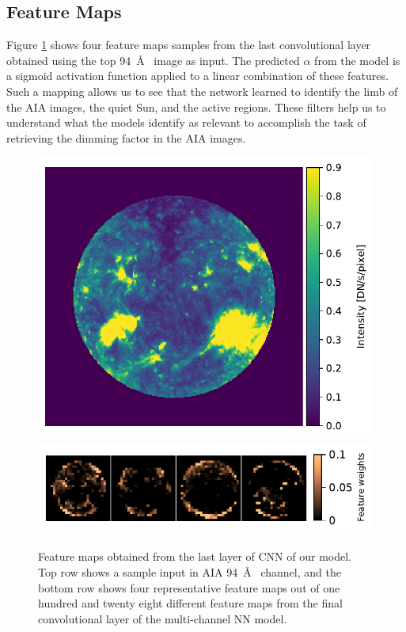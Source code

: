 \documentclass[twocolumn,usenames,dvipsnames]{aastex63}
\begin{document}
\subsection{Feature Maps}
    \label{sec:feature-maps}

Figure \ref{fig:autocalibrate_activation_viz} shows four feature maps samples from the last convolutional layer obtained using the top 94~\AA~ image as input. The predicted $\alpha$ from the model is a sigmoid activation function applied to a linear combination of these features. Such a mapping allows us to see that the network learned to identify the limb of the AIA images, the quiet Sun, and the active regions. These filters help us to understand what the models identify as relevant to accomplish the task of retrieving the dimming factor in the AIA images. 

\begin{figure} [h]
  \centering
  \includegraphics[width=0.8\linewidth]{reference.pdf}
  \includegraphics[width=\linewidth]{latent.pdf}
  \caption{Feature maps obtained from the last layer of CNN of our model. Top row shows a sample input in AIA 94~\AA~ channel, and the bottom row shows four representative feature maps out of one hundred and twenty eight different feature maps from the final convolutional layer of the multi-channel NN model.}
  \label{fig:autocalibrate_activation_viz}
\end{figure}
\end{document}
